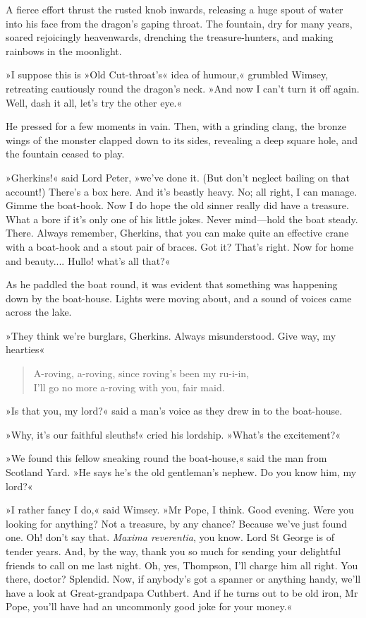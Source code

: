 A fierce effort thrust the rusted knob inwards, releasing a huge spout of water into his face from the dragon's gaping throat. The fountain, dry for many years, soared rejoicingly heavenwards, drenching the treasure-hunters, and making rainbows in the moonlight.

»I suppose this is »Old Cut-throat's« idea of humour,« grumbled Wimsey, retreating cautiously round the dragon's neck. »And now I can't turn it off again. Well, dash it all, let's try the other eye.«

He pressed for a few moments in vain. Then, with a grinding clang, the bronze wings of the monster clapped down to its sides, revealing a deep square hole, and the fountain ceased to play.

»Gherkins!« said Lord Peter, »we've done it. (But don't neglect bailing on that account!) There's a box here. And it's beastly heavy. No; all right, I can manage. Gimme the boat-hook. Now I do hope the old sinner really did have a treasure. What a bore if it's only one of his little jokes. Never mind—hold the boat steady. There. Always remember, Gherkins, that you can make quite an effective crane with a boat-hook and a stout pair of braces. Got it? That's right. Now for home and beauty.... Hullo! what's all that?«

As he paddled the boat round, it was evident that something was happening down by the boat-house. Lights were moving about, and a sound of voices came across the lake.

»They think we're burglars, Gherkins. Always misunderstood. Give way, my hearties\longdash«

\begin{quote}
A-roving, a-roving, since roving's been my ru-i-in,\\
I'll go no more a-roving with you, fair maid.
\end{quote}

»Is that you, my lord?« said a man's voice as they drew in to the boat-house.

»Why, it's our faithful sleuths!« cried his lordship. »What's the excitement?«

»We found this fellow sneaking round the boat-house,« said the man from Scotland Yard. »He says he's the old gentleman's nephew. Do you know him, my lord?«

»I rather fancy I do,« said Wimsey. »Mr Pope, I think. Good evening. Were you looking for anything? Not a treasure, by any chance? Because we've just found one. Oh! don't say that. \textit{Maxima reverentia}, you know. Lord St George is of tender years. And, by the way, thank you so much for sending your delightful friends to call on me last night. Oh, yes, Thompson, I'll charge him all right. You there, doctor? Splendid. Now, if anybody's got a spanner or anything handy, we'll have a look at Great-grandpapa Cuthbert. And if he turns out to be old iron, Mr Pope, you'll have had an uncommonly good joke for your money.«

